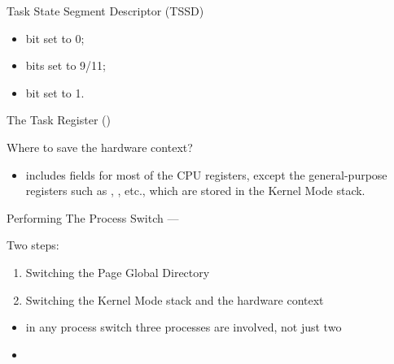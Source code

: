 \begin{frame}
  \begin{block}{Task State Segment Descriptor (TSSD)}
    \begin{center}
       
    \end{center}
    \begin{itemize}
    \item {} bit set to 0;
    \item {} bits set to 9/11;
    \item {} bit set to 1.
    \end{itemize}
  \end{block}
\end{frame}

\begin{frame}{The Task Register ()}
  \begin{center}
     
  \end{center}
\end{frame}

\begin{frame}
  \begin{block}{Where to save the hardware context?}
    \begin{center}
       
    \end{center}
    \begin{itemize}
    \item {} includes fields for most of the CPU registers, except the
      general-purpose registers such as , , etc., which are stored in
      the Kernel Mode stack.
    \end{itemize}
  \end{block}
\end{frame}

\begin{frame}{Performing The Process Switch}{ --- }
  \begin{block}{Two steps:}
    \begin{enumerate}
    \item Switching the Page Global Directory
    \item Switching the Kernel Mode stack and the hardware context
    \end{enumerate}
  \end{block}
  \begin{block}{}
    \begin{itemize}
    \item in any process switch three processes are involved, not just two
    \item
    \end{itemize}
  \end{block}
\end{frame}

